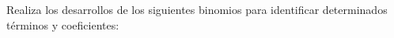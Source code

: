 \documentclass[addpoints,spanish, 12pt,a4paper]{exam}
\begin{document}
\begin{questions}
\begin{multicols}{1}
\begin{parts}
        \end{parts}
        \end{multicols}
        \question Realiza los desarrollos de los siguientes binomios para identificar determinados términos y coeficientes:
        \begin{multicols}{1} 
        \end{multicols}
        
    \end{questions}
    
\end{document}
